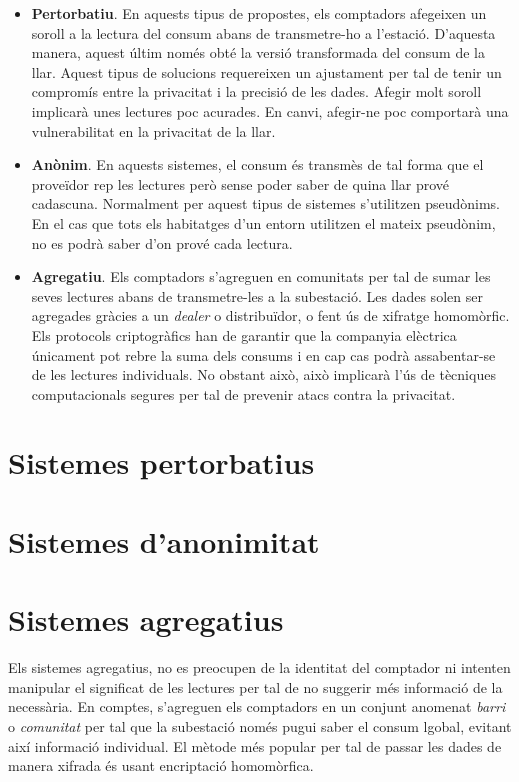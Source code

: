 \documentclass{article}
\begin{document}
\begin{itemize}
	\item \textbf{Pertorbatiu}. En aquests tipus de propostes, els comptadors afegeixen un soroll a la lectura del consum abans de transmetre-ho a l'estació. D'aquesta manera, aquest últim només obté la versió transformada del consum de la llar. Aquest tipus de solucions requereixen un ajustament per tal de tenir un compromís entre la privacitat i la precisió de les dades. Afegir molt soroll implicarà unes lectures poc acurades. En canvi, afegir-ne poc comportarà una vulnerabilitat en la privacitat de la llar. 
	\item \textbf{Anònim}. En aquests sistemes, el consum és transmès de tal forma que el proveïdor rep les lectures però sense poder saber de quina llar prové cadascuna. Normalment per aquest tipus de sistemes s'utilitzen pseudònims. En el cas que tots els habitatges d'un entorn utilitzen el mateix pseudònim, no es podrà saber d'on prové cada lectura.
	\item \textbf{Agregatiu}. Els comptadors s'agreguen en comunitats per tal de sumar les seves lectures abans de transmetre-les a la subestació. Les dades solen ser agregades gràcies a un \textit{dealer} o distribuïdor, o fent ús de xifratge homomòrfic. Els protocols criptogràfics han de garantir que la companyia elèctrica únicament pot rebre la suma dels consums i en cap cas podrà assabentar-se de les lectures individuals. No obstant això, això implicarà l'ús de tècniques computacionals segures per tal de prevenir atacs contra la privacitat.
\end{itemize}
\section{Sistemes pertorbatius}

\section{Sistemes d'anonimitat}

\section{Sistemes agregatius}
Els sistemes agregatius, no es preocupen de la identitat del comptador ni intenten manipular el significat de les lectures per tal de no suggerir més informació de la necessària. En comptes, s'agreguen els comptadors en un conjunt anomenat \textit{barri} o \textit{comunitat} per tal que la subestació només pugui saber el consum lgobal, evitant així informació individual. El mètode més popular per tal de passar les dades de manera xifrada és usant encriptació homomòrfica. 
\end{document}
